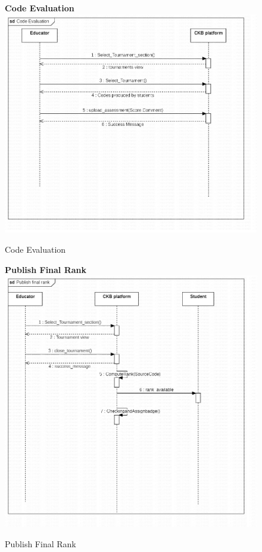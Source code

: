 \begin{enumerate}[label=\textbf{[UC\arabic*]}]
    \begin{figure}
    \item \textbf{Code Evaluation}
        \centering
        \includegraphics[width= \textwidth]{Images/f4c0a22a-3bab-4ba7-8605-08f8577774b5}
        \caption{Code Evaluation}
        \label{fig:enter-label}
    \end{figure}
    
    \begin{figure}
    \item \textbf{Publish Final Rank}
        \centering
        \includegraphics[width= \textwidth]{Images/e08ea53b-0385-4fb7-8284-6672fda72856}
        \caption{Publish Final Rank}
        \label{fig:enter-label}
    \end{figure}


\end{enumerate}
